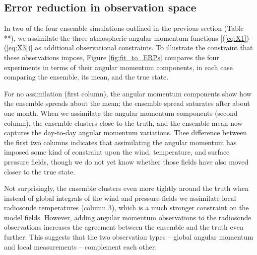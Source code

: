 
\subsection{Error reduction in observation space}
In two of the four ensemble simulations outlined in the previous section (Table **), we assimilate the three atmospheric angular momentum functions [(\ref{eq:X1})-(\ref{eq:X3})] as additional observational constraints.
To illustrate the constraint that these observations impose, Figure \ref{fig:fit_to_ERPs} compares the four experiments in terms of their angular momentum components, in each case comparing the ensemble, its mean, and the true state.

For no assimilation (first column), the angular momentum components show how the ensemble spreads about the mean; the ensemble spread saturates after about one month.
When we assimilate the angular momentum components (second column), the ensemble clusters close to the truth, and the ensemble mean now captures the day-to-day angular momentum variations. 
Thee difference between the first two columns indicates that assimilating the angular momentum has imposed some kind of constraint upon the wind, temperature, and surface pressure fields, though we do not yet know whether those fields have also moved closer to the true state. 

Not surprisingly, the ensemble clusters even more tightly around the truth when instead of global integrals of the wind and pressure fields we assimilate local radiosonde temperatures (column 3), which is a much stronger constraint on the model fields. 
However, adding angular momentum observations to the radiosonde observations increases the agreement between the ensemble and the truth even further.
This suggests that the two observation types -- global angular momentum and local measurements -- complement each other.


